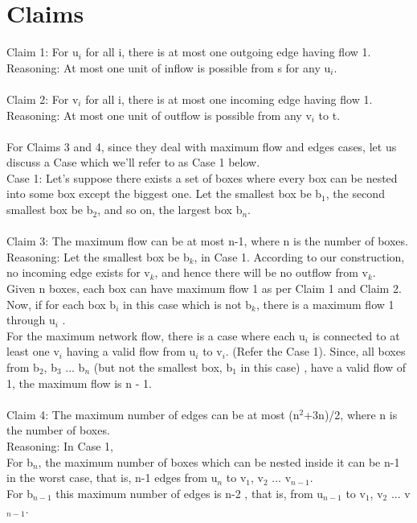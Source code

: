 \documentclass{article}
\begin{document}
\section{Claims}
Claim 1: For u$_i$ for all i, there is at most one outgoing edge having flow 1.\\
Reasoning: At most one unit of inflow is possible from s for any u$_i$.\\
\\
Claim 2: For v$_i$ for all i, there is at most one incoming edge having flow 1.\\
Reasoning: At most one unit of outflow is possible from any v$_i$ to t.\\
\\
For Claims 3 and 4, since they deal with maximum flow and edges cases, let us discuss a Case which we'll refer to as Case 1 below.\\
Case 1:  Let's suppose there exists a set of boxes where every box can be nested into some box except the biggest one. Let the smallest box be b$_1$, the second smallest box be b$_2$, and so on, the largest box b$_n$.\\
\\
Claim 3: The maximum flow can be at most n-1, where n is the number of boxes.\\
Reasoning: Let the smallest box be b$_k$, in Case 1. According to our construction, no incoming edge exists for v$_k$, and hence there will be no outflow from v$_k$. \\
Given n boxes, each box can have maximum flow 1 as per Claim 1 and Claim 2. Now, if for each box b$_i$ in this case which is not b$_k$, there is a maximum flow 1 through u$_i$ .\\
For the maximum network flow, there is a case where each u$_i$ is connected to at least one v$_i$ having a valid flow from u$_i$ to v$_i$. (Refer the Case 1).
Since, all boxes from b$_2$, b$_3$ ... b$_n$ (but not the smallest box, b$_1$ in this case) , have a valid flow of 1, the maximum flow is n - 1.\\
\\
Claim 4: The maximum number of edges can be at most (n$^2$+3n)/2, where n is the number of boxes.\\
Reasoning: In Case 1,\\ 
For b$_n$, the maximum number of boxes which can be nested inside it can be n-1 in the worst case, that is, n-1 edges from u$_n$ to v$_1$, v$_2$ ... v$_{n-1}$.\\For b$_{n-1}$ this maximum number of edges is n-2 , that is, from u$_{n-1}$ to  v$_1$, v$_2$ ... v$_{n-1}$.
\end{document}
